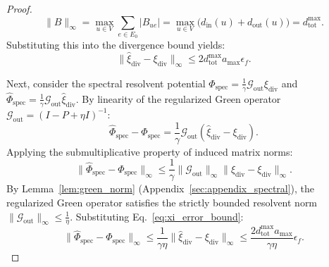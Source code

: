\documentclass[11pt,a4paper]{article}
\begin{document}
\begin{proof}
\begin{equation}
\|B\|_\infty = \max_{u \in V} \sum_{e \in E_0} |B_{ue}| = \max_{u \in V} \big( d_{\text{in}}(u) + d_{\text{out}}(u) \big) = d_{\text{tot}}^{\max}.
\end{equation}
Substituting this into the divergence bound yields:
\begin{equation}
\label{eq:xi_error_bound}
\|\hat{\xi}_{\text{div}} - \xi_{\text{div}}\|_\infty \le 2 d_{\text{tot}}^{\max} a_{\max} \epsilon_f.
\end{equation}

Next, consider the spectral resolvent potential $\Phi_{\text{spec}} = \frac{1}{\gamma} \mathcal{G}_{\text{out}} \xi_{\text{div}}$ and $\hat{\Phi}_{\text{spec}} = \frac{1}{\gamma} \mathcal{G}_{\text{out}} \hat{\xi}_{\text{div}}$. By linearity of the regularized Green operator $\mathcal{G}_{\text{out}} = (I - P + \eta I)^{-1}$:
\begin{equation}
\hat{\Phi}_{\text{spec}} - \Phi_{\text{spec}} = \frac{1}{\gamma} \mathcal{G}_{\text{out}} (\hat{\xi}_{\text{div}} - \xi_{\text{div}}).
\end{equation}
Applying the submultiplicative property of induced matrix norms:
\begin{equation}
\|\hat{\Phi}_{\text{spec}} - \Phi_{\text{spec}}\|_\infty \le \frac{1}{\gamma} \|\mathcal{G}_{\text{out}}\|_\infty \|\hat{\xi}_{\text{div}} - \xi_{\text{div}}\|_\infty.
\end{equation}
By Lemma~\ref{lem:green_norm} (Appendix~\ref{sec:appendix_spectral}), the regularized Green operator satisfies the strictly bounded resolvent norm $\|\mathcal{G}_{\text{out}}\|_\infty \le \frac{1}{\eta}$. Substituting Eq.~\eqref{eq:xi_error_bound}:
\begin{equation}
\label{eq:phi_spec_error_bound}
\|\hat{\Phi}_{\text{spec}} - \Phi_{\text{spec}}\|_\infty \le \frac{1}{\gamma \eta} \|\hat{\xi}_{\text{div}} - \xi_{\text{div}}\|_\infty \le \frac{2 d_{\text{tot}}^{\max} a_{\max}}{\gamma \eta} \epsilon_f.
\end{equation}


\end{proof}
\end{document}
